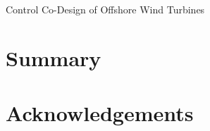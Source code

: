 \documentclass[11pt,oneside,a4paper]{report}
\begin{document}
\begin{titlepage}
\centering\vspace*{2in}
{\Huge Control Co-Design of Offshore Wind Turbines\par}\vspace{0.5in}{\Large Lotte de Vries\par}
\end{titlepage}



\chapter*{Summary}

\clearpage
\chapter*{Acknowledgements}

\clearpage
\tableofcontents
\listoffigures
\listoftables
\clearpage
{}






\appendix




\end{document}
